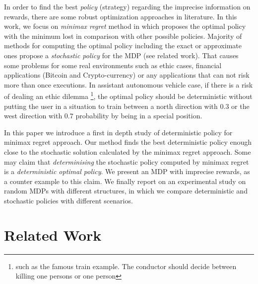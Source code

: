 \documentclass[runningheads,a4paper]{llncs}
\begin{document}
In order to find the best \textit{policy} (strategy) regarding the imprecise information on rewards, there are some robust optimization approaches in literature\cite{Ahmed2017,Iyengar2005,Nilim2003,Xu2009}. In this work, we focus on \textit{minimax regret} method \cite{Regan2009} in which proposes the optimal policy with the minimum lost in comparison with other possible policies. Majority of methods for computing the optimal policy including the exact or approximate ones propose a \textit{stochastic policy} for the MDP (see related work). That causes some problems for some real environments such as ethic cases, financial applications (Bitcoin and Crypto-currency) or any applications that can not risk more than once executions. In assistant autonomous vehicle case, if there is a risk of dealing an ethic dilemma \footnote{such as the famous train example. The conductor should decide between killing one persons or one person}, the optimal policy should be deterministic without putting the user in a situation to train between a north direction with $0.3$ or the west direction with $0.7$ probability by being in a special position.


In this paper we introduce a first in depth study of deterministic policy for minimax regret approach. Our method finds the best deterministic policy enough close to the stochastic solution calculated by the minimax regret approach. Some may claim that \textit{determinising} the stochastic policy computed by minimax regret is a \textit{deterministic optimal policy}. We present an MDP with imprecise rewards, as a counter example to this claim. We finally report on an experimental study on random MDPs with different structures, in which we compare deterministic and stochastic policies with different scenarios. 


\section{Related Work}



\end{document}
